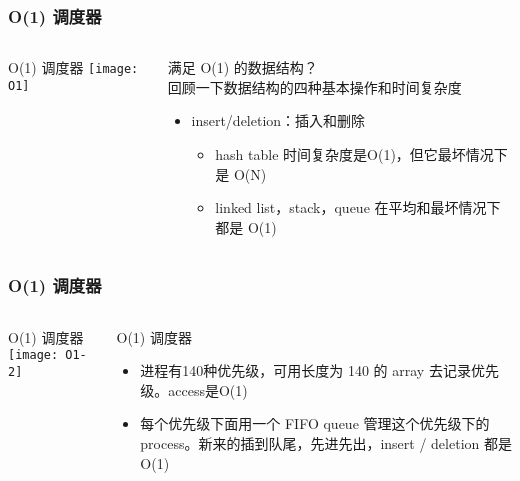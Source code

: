 \begin{frame}
	\frametitle{ O(1) 调度器}
	\begin{columns}
		\begin{column}{.4\textwidth}
			\Large \centering
			O(1) 调度器
			\texttt{[image: O1]}
			
		\end{column}
		
		\begin{column}{.6\textwidth}
			满足 O(1) 的数据结构？\\
			回顾一下数据结构的四种基本操作和时间复杂度
			\begin{itemize}
				\item insert/deletion：插入和删除
				\begin{itemize}
					\item hash table 时间复杂度是O(1)，但它最坏情况下是 O(N) 
					\item linked list，stack，queue 在平均和最坏情况下都是 O(1)
				\end{itemize}
			\end{itemize}
		\end{column}
	\end{columns}
\end{frame}



\begin{frame}
	\frametitle{ O(1) 调度器}
	\begin{columns}
		\begin{column}{.6\textwidth}
			\Large \centering
			O(1) 调度器
			\texttt{[image: O1-2]}
			
		\end{column}
		
		\begin{column}{.4\textwidth}
			O(1) 调度器\\
			
			\begin{itemize}
				\item 进程有140种优先级，可用长度为 140 的 array 去记录优先级。access是O(1)

				\item 每个优先级下面用一个 FIFO queue 管理这个优先级下的 process。新来的插到队尾，先进先出，insert / deletion 都是 O(1)

			\end{itemize}
		\end{column}
	\end{columns}
\end{frame}

